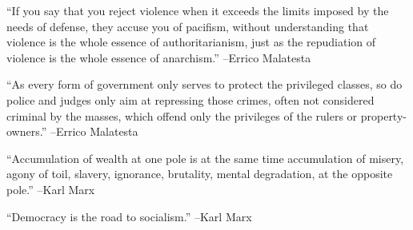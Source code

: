 \documentclass{article}%
\begin{document}
\linebreak%
\vspace{1mm}%
\begin{minipage}{\textwidth}%
\flushleft%
“If you say that you reject violence when it exceeds the limits imposed by the needs of defense, they accuse you of pacifism, without understanding that violence is the whole essence of authoritarianism, just as the repudiation of violence is the whole essence of anarchism.”%
\linebreak%
\vspace{1mm}%
–Errico Malatesta%
\linebreak%
\vspace{1mm}%
\end{minipage}%
\linebreak%
\vspace{1mm}%
\begin{minipage}{\textwidth}%
\flushleft%
“As every form of government only serves to protect the privileged classes, so do police and judges only aim at repressing those crimes, often not considered criminal by the masses, which offend only the privileges of the rulers or property{-}owners.”%
\linebreak%
\vspace{1mm}%
–Errico Malatesta%
\linebreak%
\vspace{1mm}%
\end{minipage}%
\linebreak%
\vspace{1mm}%
\begin{minipage}{\textwidth}%
\flushleft%
“Accumulation of wealth at one pole is at the same time accumulation of misery, agony of toil, slavery, ignorance, brutality, mental degradation, at the opposite pole.”%
\linebreak%
\vspace{1mm}%
–Karl Marx%
\linebreak%
\vspace{1mm}%
\end{minipage}%
\linebreak%
\vspace{1mm}%
\begin{minipage}{\textwidth}%
\flushleft%
“Democracy is the road to socialism.”%
\linebreak%
\vspace{1mm}%
–Karl Marx%
\linebreak%
\vspace{1mm}%
\end{minipage}%
\end{document}
